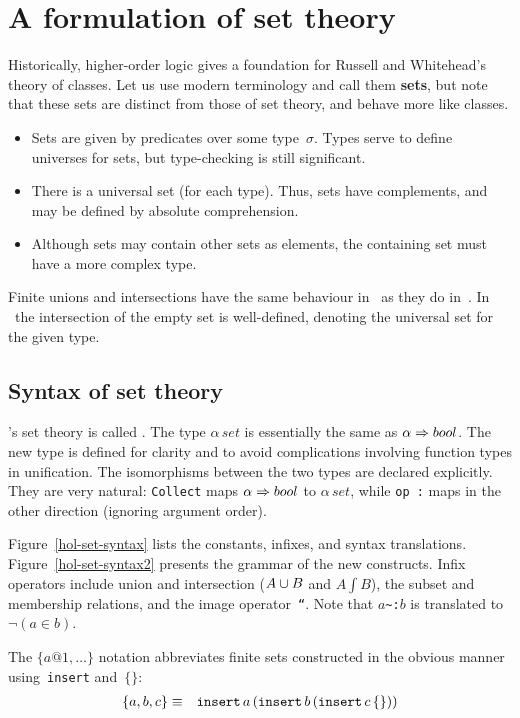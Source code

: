 \section{A formulation of set theory}
Historically, higher-order logic gives a foundation for Russell and
Whitehead's theory of classes.  Let us use modern terminology and call them
{\bf sets}, but note that these sets are distinct from those of {\ZF} set
theory, and behave more like {\ZF} classes.
\begin{itemize}
\item
Sets are given by predicates over some type~$\sigma$.  Types serve to
define universes for sets, but type-checking is still significant.
\item
There is a universal set (for each type).  Thus, sets have complements, and
may be defined by absolute comprehension.
\item
Although sets may contain other sets as elements, the containing set must
have a more complex type.
\end{itemize}
Finite unions and intersections have the same behaviour in \HOL\ as they
do in~{\ZF}.  In \HOL\ the intersection of the empty set is well-defined,
denoting the universal set for the given type.

\subsection{Syntax of set theory}
\HOL's set theory is called .  The type $\alpha\,set$ is
essentially the same as $\alpha\Rightarrow bool$.  The new type is defined for
clarity and to avoid complications involving function types in unification.
The isomorphisms between the two types are declared explicitly.  They are
very natural: \texttt{Collect} maps $\alpha\Rightarrow bool$ to $\alpha\,set$, while
\hbox{\tt op :} maps in the other direction (ignoring argument order).

Figure~\ref{hol-set-syntax} lists the constants, infixes, and syntax
translations.  Figure~\ref{hol-set-syntax2} presents the grammar of the new
constructs.  Infix operators include union and intersection ($A\cup B$
and $A\int B$), the subset and membership relations, and the image
operator~{\tt``}\@.  Note that $a$\verb|~:|$b$ is translated to
$\neg(a\in b)$.  

The $\{a@1,\ldots\}$ notation abbreviates finite sets constructed in
the obvious manner using~\texttt{insert} and~$\{\}$:
\begin{eqnarray*}
  \{a, b, c\} & \equiv &
  \texttt{insert} \, a \, ({\tt insert} \, b \, ({\tt insert} \, c \, \{\}))
\end{eqnarray*}

